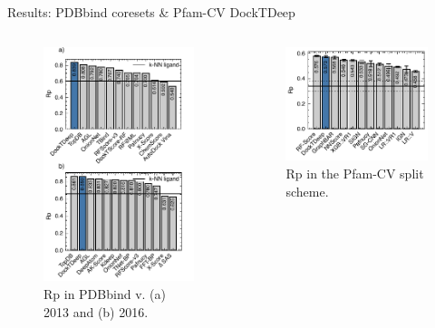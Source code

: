 \documentclass[aspectratio=169,xcolor=dvipsnames]{beamer}
\begin{document}
\begin{frame}{Results: PDBbind coresets & Pfam-CV \hfill {\footnotesize \alert{DockTDeep}}}
    \begin{columns}[c]
        \begin{figure}
            \centering
            \includegraphics[width=.6\textwidth]{imgs/results/fig5b_coreset16_comparison_up.pdf}
            \caption{Rp in PDBbind v. (a) 2013 and (b) 2016.}
        \end{figure}

        \begin{figure}
            \centering
            \includegraphics[width=.7\textwidth]{imgs/results/fig5c_pfam_external_performance.pdf}
            \caption{Rp in the Pfam-CV split scheme.}
        \end{figure}
    \end{columns}

\end{frame}
\end{document}
